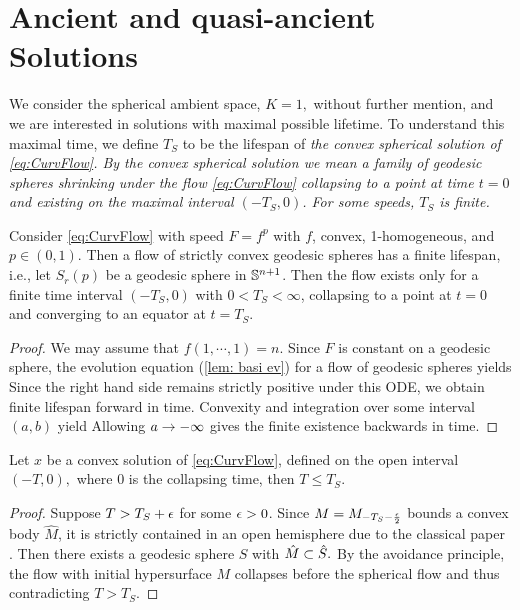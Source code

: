 \documentclass{amsart}
\begin{document}
\section{Ancient and quasi-ancient Solutions}
\label{sec:quasi_ancient}

We consider the spherical ambient space, $K=1,$ without further mention, and we are interested in solutions with maximal possible lifetime. To understand this maximal time, we define $T_S$ to be the lifespan of \it{the} convex spherical solution of \eqref{eq:CurvFlow}. By the convex spherical solution we mean a family of geodesic spheres shrinking under the flow \eqref{eq:CurvFlow} collapsing to a point at time $t=0$ and existing on the maximal interval \((-T_S, 0)\). For some speeds, \(T_S\) is finite.

\begin{lemma}
 Consider \eqref{eq:CurvFlow} with speed \(F = f^p\) with \(f\), convex, 1-homogeneous, and \(p \in (0,1)\). Then a flow of strictly convex geodesic spheres has a finite lifespan, i.e., let $S_r(p)$ be a geodesic sphere in $\S^{n+1}$. Then the flow exists only for a finite time interval \((-T_S,0)\) with \(0 < T_S < \infty\), collapsing to a point at \(t=0\) and converging to an equator at \(t=T_S\).
\end{lemma}

\begin{proof}
We may assume that $f(1,\cdots,1)=n.$
Since $F$ is constant on a geodesic sphere, the evolution equation (\ref{lem: basi ev}) for a flow of geodesic spheres yields
Since the right hand side remains strictly positive under this ODE, we obtain finite lifespan forward in time.
Convexity and integration over some interval $(a,b)$ yield
Allowing $a\ra-\8$ gives the finite existence backwards in time.
\end{proof}

\begin{lemma}
Let $x$ be a convex solution of \eqref{eq:CurvFlow}, defined on the open interval $(-T,0),$ where $0$ is the collapsing time, then $T\leq T_S.$
\end{lemma}

\begin{proof}
Suppose $T>T_S+\e$ for some $\e>0$. Since $M=M_{-T_S-\fr{\e}{2}}$ bounds a convex body $\hat{M}$, it is strictly contained in an open hemisphere due to the classical paper \cite{CarmoWarner:/1970}. Then there exists a geodesic sphere $S$ with $\hat{M}\sub\hat{S}.$ By the avoidance principle, the flow with initial hypersurface $M$ collapses before the spherical flow and thus contradicting $T>T_S$.
\end{proof}
\end{document}
